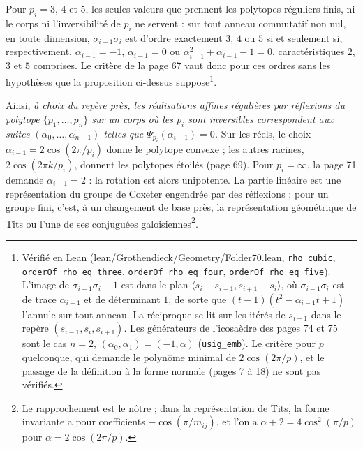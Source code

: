 \documentclass[11pt,a4paper]{article}
\begin{document}
Pour $p_i = 3$, $4$ et $5$, les seules valeurs que prennent les polytopes
réguliers finis, ni le corps ni l'inversibilité de $p_i$ ne servent : sur tout
anneau commutatif non nul, en toute dimension, $\sigma_{i-1}\sigma_i$ est
d'ordre exactement $3$, $4$ ou $5$ si et seulement si, respectivement,
$\alpha_{i-1} = -1$, $\alpha_{i-1} = 0$ ou $\alpha_{i-1}^2 + \alpha_{i-1} - 1 =
0$, caractéristiques $2$, $3$ et $5$ comprises. Le critère de la page 67 vaut
donc pour ces ordres sans les hypothèses que la proposition
ci-dessus suppose\footnote{Vérifié en Lean (lean/Grothendieck/Geometry/Folder70.lean,
\texttt{rho\_cubic}, \texttt{orderOf\_rho\_eq\_three},
\texttt{orderOf\_rho\_eq\_four}, \texttt{orderOf\_rho\_eq\_five}). L'image de
$\sigma_{i-1}\sigma_i - 1$ est dans le plan $\langle s_i - s_{i-1}, s_{i+1} -
s_i \rangle$, où $\sigma_{i-1}\sigma_i$ est de trace $\alpha_{i-1}$ et de
déterminant $1$, de sorte que $(t - 1)(t^2 - \alpha_{i-1} t + 1)$ l'annule sur
tout anneau. La réciproque se lit sur les itérés de $s_{i-1}$ dans le repère
$(s_{i-1}, s_i, s_{i+1})$. Les générateurs de l'icosaèdre des pages 74 et 75
sont le cas $n = 2$, $(\alpha_0, \alpha_1) = (-1, \alpha)$
(\texttt{usig\_emb}). Le critère pour $p$ quelconque, qui demande le polynôme
minimal de $2\cos(2\pi/p)$, et le passage de la définition à la forme normale
(pages 7 à 18) ne sont pas vérifiés.}.

Ainsi, \emph{à choix du repère près, les réalisations affines régulières par
réflexions du polytope $\{p_1, \dots, p_n\}$ sur un corps où les $p_i$ sont
inversibles correspondent aux suites $(\alpha_0, \dots, \alpha_{n-1})$ telles
que $\Psi_{p_i}(\alpha_{i-1}) = 0$.} Sur les réels, le choix $\alpha_{i-1} =
2\cos(2\pi/p_i)$ donne le polytope convexe ; les autres racines, $2\cos(2\pi
k/p_i)$, donnent les polytopes étoilés (page 69). Pour $p_i = \infty$, la page 71
demande $\alpha_{i-1} = 2$ : la rotation est alors unipotente. La partie
linéaire est une représentation du groupe de Coxeter engendrée par des
réflexions ; pour un groupe fini, c'est, à un changement de base près, la
représentation géométrique de Tits ou l'une de ses conjuguées
galoisiennes\footnote{Le rapprochement est le nôtre ; dans la représentation de
Tits, la forme invariante a pour coefficients $-\cos(\pi / m_{ij})$, et l'on a
$\alpha + 2 = 4\cos^2(\pi / p)$ pour $\alpha = 2\cos(2\pi / p)$.}.
\end{document}
